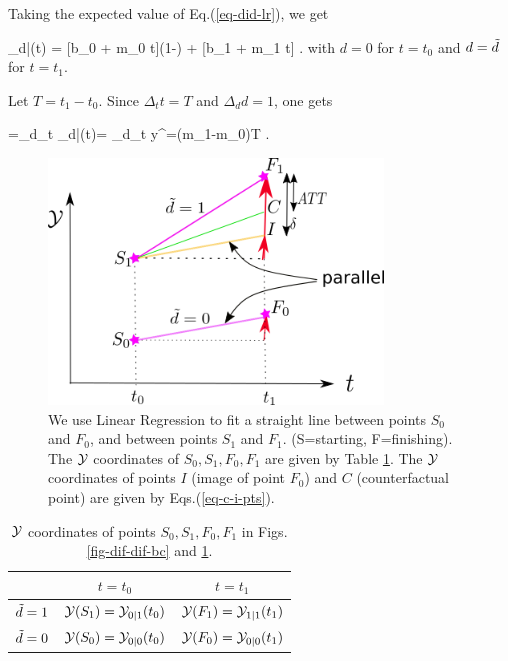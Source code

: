 Taking the expected value
of Eq.(\ref{eq-did-lr}), we get

\beq
\caly_{d|\td}(t) = 
[b_0 + m_0 t](1-\td)
+  [b_1 + m_1 t]\td
\;.
\eeq  
with $d=0$ for $t=t_0$
and $d={\tilde{d}}$ for $t=t_1$.

Let $T=t_1-t_0$. Since
$\Delta_t t=T$ and $\Delta_d d=1$, one gets

\beq
\delta=\Delta_d\Delta_t \calm\caly_{d|\td}(t)=
\Delta_d\Delta_t y^\s=(m_1-m_0)T
\;.
\eeq



\begin{figure}[h!]
\centering
\includegraphics[width=3.5in]
{did/parallel-trends.png}
\caption{We use
Linear Regression
to fit a straight line
between points $S_0$
and $F_0$,
and between points
$S_1$ and $F_1$.
(S=starting, F=finishing).
The ${\cal Y}$
coordinates
of $S_0, S_1, F_0, F_1$
are given by Table \ref{tab-did-points}.
The ${\cal Y}$
coordinates of points
$I$ (image of point $F_0$)
and $C$ (counterfactual point)
are 
given by Eqs.(\ref{eq-c-i-pts}).
} 
\label{fig-parallel-trends}
\end{figure}

\begin{table}[h!]
\centering
{\renewcommand{\arraystretch}{1.2}
\begin{tabular}{|c|c|c|}
\hline 
\rowcolor[HTML]{ECF4FF} 
 & $t=t_0$ & $t=t_1$ \\ 
\hline
${\tilde{d}}=1$ \cellcolor[HTML]{ECF4FF}& ${\cal Y}(S_1)={\cal Y}_{0|1}(t_0)$ & ${\cal Y}(F_1)={\cal Y}_{1|1}(t_1)$ \\ 
\hline 
${\tilde{d}}=0$\cellcolor[HTML]{ECF4FF} & ${\cal Y}(S_0)={\cal Y}_{0|0}(t_0)$ & ${\cal Y}(F_0)={\cal Y}_{0|0}(t_1)$ \\ 
\hline 
\end{tabular}
}
\caption{
${\cal Y}$ coordinates
of points
$S_0, S_1, F_0, F_1$
in Figs.\ref{fig-dif-dif-bc}
 and \ref{fig-parallel-trends}.
}
\label{tab-did-points}
\end{table}



